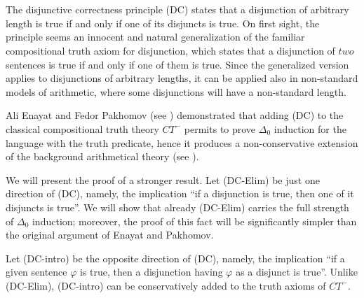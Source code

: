 \documentclass[bsl,meeting]{asl}
\newcommand{\NP}{}
\begin{document}
\thispagestyle{empty}


\NP  
{}
 \\ \\

The disjunctive correctness principle (DC) states that a disjunction of arbitrary length is true if and only if one of its disjuncts is true. On first sight, the principle seems an innocent and natural generalization of the familiar compositional truth axiom for disjunction, which states that a disjunction of $two$ sentences is true if and only if one of them is true. Since the generalized version applies to disjunctions of arbitrary lengths, it can be applied also in non-standard models of arithmetic, where some disjunctions will have a non-standard length.

Ali Enayat and Fedor Pakhomov (see \cite{enpa}) demonstrated that adding (DC) to the classical compositional truth theory $CT^-$ permits to prove $\Delta_0$ induction for the language with the truth predicate, hence it produces a non-conservative extension of the background arithmetical theory (see \cite{wcislyk}).

We will present the proof of a stronger result. Let (DC-Elim) be just one direction of (DC), namely, the implication ``if a disjunction is true, then one of it disjuncts is true''. We will show that already (DC-Elim) carries the full strength of $\Delta_0$ induction; moreover, the proof of this fact will be significantly simpler than the original argument of Enayat and Pakhomov.

Let (DC-intro) be the opposite direction of (DC), namely, the implication ``if a given sentence $\varphi$ is true, then a disjunction having $\varphi$ as a disjunct is true''. Unlike (DC-Elim), (DC-intro) can be conservatively added to the truth axioms of $CT^-$.
 \\ \\
\end{document}
